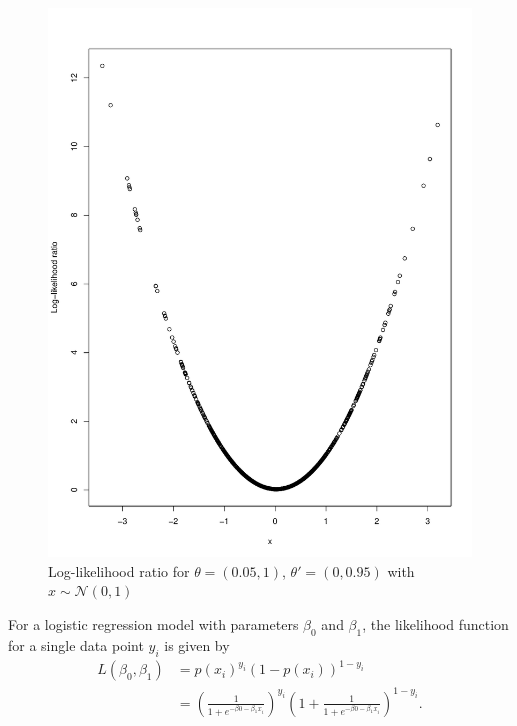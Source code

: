 \subsection{}
\begin{figure}[H]
    \centering
    \includegraphics[scale = 0.6]{figures/loglik_ratio1.pdf}
    \caption{Log-likelihood ratio for $\theta = \left(0.05, 1\right)$, $\theta' = \left(0, 0.95\right)$  with $x \sim \mathcal{N}\left(0,1\right)$}
    \label{fig:loglik_ratio_gaussian}
\end{figure}
For a logistic regression model with parameters $\beta_0$ and $\beta_1$, the likelihood function for a single data point $y_i$ is given by 
\begin{equation}\label{eq:logist_likelihood}
\begin{split}
    L\left(\beta_0, \beta_1\right) &= p\left(x_i\right)^{y_i} \left(1 - p\left(x_i\right)\right)^{1-y_i} \\
    &= \left(\frac{1}{1 +  e^{-\beta0 -\beta_1 x_i}}\right)^{y_i} \left(1 +  \frac{1}{1 +  e^{-\beta0 -\beta_1 x_i}}\right)^{1 - y_i}. 
\end{split}
\end{equation}
